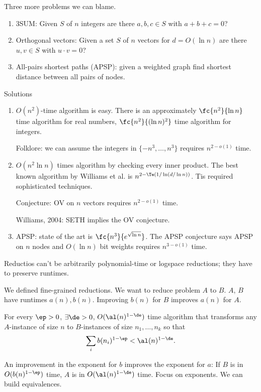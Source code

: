 Three more problems we can blame.
\begin{enumerate}
\item
3SUM: Given $S$ of $n$ integers are there $a,b,c\in S$ with $a+b+c=0$?
\item
Orthogonal vectors: Given a set $S$ of $n$ vectors for $d=O(\ln n)$ are there $u,v\in S$ with $u\cdot v=0$?
\item
All-pairs shortest paths (APSP): given a weighted graph find shortest distance between all pairs of nodes.
\end{enumerate}

Solutions
\begin{enumerate}
\item
$O(n^2)$-time algorithm is easy. There is an approximately $\fc{n^2}{\ln n}$ time algorithm for real numbers, $\fc{n^2}{(\ln n)^2}$ time algorithm for integers.

Folklore: we can assume the integers in $\{-n^3,\ldots, n^3\}$ requires $n^{2-o(1)}$ time.
\item
$O(n^2\ln n)$ times algorithm by checking every inner product. The best known algorithm by Williams et al. is $n^{2-\Te(1/\ln(d/\ln n))}$. Tis required sophisticated techniques.

Conjecture: OV on $n$ vectors requires $n^{2-o(1)}$ time.

Williams, 2004: SETH implies the OV conjecture.
\item
APSP: state of the art is $\fc{n^3}{e^{\sqrt{\ln n}}}$. The APSP conjecture says APSP on $n$ nodes and $O(\ln n)$ bit weights requires $n^{3-o(1)}$ time.
\end{enumerate}

Reductios can't be arbitrarily polynomial-time or logspace reductions; they have to preserve runtimes. 

We defined fine-grained reductions. We want to reduce problem $A$ to $B$. $A$, $B$ have runtimes $a(n),b(n)$. Improving $b(n)$ for $B$ improves $a(n)$ for $A$.
\begin{df}
For every $\ep>0$, $\exists \de>0$, $O(\al(n)^{1-\de})$ time algorithm that transforms any $A$-instance of size $n$ to $B$-instances of size $n_1,\ldots, n_k$ so that
\[
\sum_i b(n_i)^{1-\ep}<\al(n)^{1-\de}.
\]
\end{df}
An improvement in the exponent for $b$ improves the exponent for $a$: If $B$ is in $O(b(n)^{1-\ep})$ time, $A$ is in $O(\al(n)^{1-\de})$ time. Focus on exponents. We can build equivalences.



